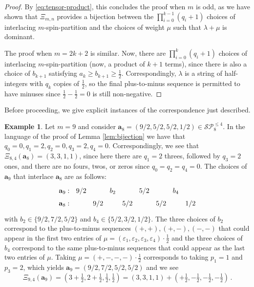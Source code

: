 \documentclass[10pt]{amsart}
\numberwithin{equation}{section}
\theoremstyle{definition}
\newtheorem{example}[thm]{Example}
\newcommand{\ab}{\mathbf{a}}
\newcommand{\ep}{\varepsilon}
\newcommand{\SP}{\mathcal{SP}}
\begin{document}
\begin{proof}
By \eqref{eq:tensor-product}, this concludes the proof when $m$ is odd, 
as we have shown that $\Xi_{m,n}$ provides a bijection between 
the $\prod_{i=0}^{k-1} (q_i + 1)$ choices of interlacing $m$-spin-partition and 
the choices of weight $\mu$ such that $\lambda + \mu$ is dominant.

The proof when $m = 2k+2$ is similar. 
Now, there are $\prod_{i=0}^{k} (q_i+1)$ choices of interlacing $m$-spin-partition (now, a product of $k+1$ terms), 
since there is also a choice of $b_{k+1}$ satisfying $a_k \ge b_{k+1} \ge \frac{1}{2}$. 
Correspondingly, $\lambda$ is a string of half-integers with $q_k$ copies of $\frac{1}{2}$, 
so the final plus-to-minus sequence is permitted to have minuses since $\frac{1}{2} - \frac{1}{2} = 0$ is still non-negative.
\end{proof}

Before proceeding, 
we give explicit instances of the correspondence
just described.

\begin{example}
Let $m=9$ and consider $\ab_8=(9/2, 5/2, 5/2, 1/2) \in \SP_{8}^{\le 4}$. 
In the language of the proof of Lemma \ref{lem:bijection} we have that 
$q_0=0, q_1=2, q_2=0, q_3=2, q_4=0$.
Correspondingly, we see that
$\Xi_{8,4}(\ab_8) = (3,3,1,1)$, 
since here there are $q_1=2$ threes, followed by $q_3=2$ ones, and there 
are no fours, twos, or zeros since $q_0=q_2=q_4=0$.
The choices of $\ab_9$ that interlace $\ab_8$ are as follows:
\[
\begin{tikzcd}[column sep = 0.1 em, row sep =0.1 em]
\ab_9: & 9/2 & & b_2 & & 5/2 & & b_4 &  \\
\ab_8: &  & 9/2 & & 5/2 & & 5/2 & & 1/2
	\end{tikzcd}
	\]
with $b_2 \in \{9/2,7/2,5/2\}$ and $b_4 \in \{5/2,3/2,1/2\}$.
The three choices of $b_2$ correspond to the plus-to-minus sequences $(+,+), (+,-), (-,-)$ that 
could appear in the first two entries of $\mu = (\ep_1, \ep_2, \ep_3, \ep_4) \cdot \frac{1}{2}$ 
and the three choices of $b_4$ correspond to the same plus-to-minus sequences that could appear as 
the last two entries of $\mu$.
Taking $\mu= (+,-,-,-) \cdot \frac{1}{2}$ corresponds to taking $p_1=1$ and $p_3=2$, 
which yields $\ab_9 = (9/2,7/2,5/2,5/2)$ and we see
\[
\Xi_{9,4}(\ab_9) = (3+\tfrac{1}{2},2+\tfrac{1}{2}, \tfrac{1}{2}, \tfrac{1}{2}) 
	= (3,3,1,1) + (+\tfrac{1}{2},-\tfrac{1}{2}, -\tfrac{1}{2}, -\tfrac{1}{2}) \, .
	\]
	\end{example}
\end{document}

